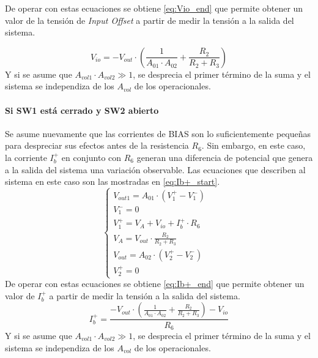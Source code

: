 De operar con estas ecuaciones se obtiene \ref{eq:Vio_end} que permite obtener un valor de la tensi\'on de \textit{Input Offset} a partir de medir la tensi\'on a la salida del sistema.

\begin{equation}
    V_{io} = -V_{out} \cdot \left(\frac{1}{A_{01} \cdot A_{02}} + \frac{R_2}{R_2+R_3}\right)
    \label{eq:Vio_end}
\end{equation}
Y si se asume que $A_{vol1} \cdot A_{vol2} \gg 1$, se desprecia el primer t\'ermino de la suma y el sistema se independiza de los $A_{vol}$ de los operacionales. 
\par

\paragraph{Si SW1 est\'a cerrado y SW2 abierto}

Se asume nuevamente que las corrientes de BIAS son lo suficientemente peque\~nas para despreciar sus efectos antes de la resistencia $R_6$. Sin embargo, en este caso, la corriente $I_b^+$ en conjunto con $R_6$ generan una diferencia de potencial que genera a la salida del sistema una variaci\'on observable.
Las ecuaciones que describen al sistema en este caso son las mostradas en \ref{eq:Ib+_start}.
\begin{equation}
    \left\{
    \begin{array}{lllll}
        V_{out1}=A_{01} \cdot (V_1^+ - V_1^-)\\
        
        V_1^- = 0 &\\
        
        V_1^+ = V_A + V_{io} + I_b^+ \cdot R_6 \\
        
        V_A = V_{out} \cdot \frac{R_2}{R_2 + R_3}\\
        
        V_{out} = A_{02} \cdot (V_2^+ - V_2^-)\\
        
        V_2^+ = 0
    \end{array}
  \right.
  \label{eq:Ib+_start}
\end{equation}
De operar con estas ecuaciones se obtiene \ref{eq:Ib+_end} que permite obtener un valor de $I_b^+$ a partir de medir la tensi\'on a la salida del sistema.
\begin{equation}
    I_b^+ = \frac{ -V_{out} \cdot \left(\frac{1}{A_{01} \cdot A_{02}} + \frac{R_2}{R_2+R_3}\right) - V_{io}}{R_6}
    \label{eq:Ib+_end}
\end{equation}
Y si se asume que $A_{vol1} \cdot A_{vol2} \gg 1$, se desprecia el primer t\'ermino de la suma y el sistema se independiza de los $A_{vol}$ de los operacionales.
\par

